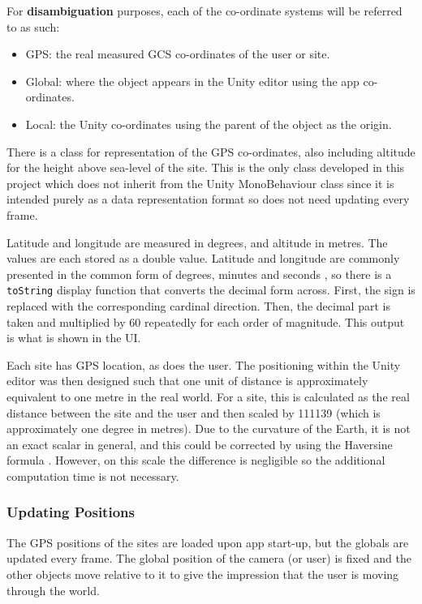 \documentclass[12pt, a4paper]{article}
\begin{document}
\newpage
For \textbf{disambiguation} purposes, each of the co-ordinate systems will be referred to as such:
\begin{itemize}
    \item GPS: the real measured GCS co-ordinates of the user or site.
    \item Global: where the object appears in the Unity editor using the app co-ordinates.
    \item Local: the Unity co-ordinates using the parent of the object as the origin.
\end{itemize}

There is a class for representation of the GPS co-ordinates, also including altitude for the height above sea-level of the site. This is the only class developed in this project which does not inherit from the Unity MonoBehaviour class since it is intended purely as a data representation format so does not need updating every frame. 

Latitude and longitude are measured in degrees, and altitude in metres. The values are each stored as a double value. Latitude and longitude are commonly presented in the common form of degrees, minutes and seconds \cite{movement:latitudelongitude}, so there is a \verb|toString| display function that converts the decimal form across. First, the sign is replaced with the corresponding cardinal direction. Then, the decimal part is taken and multiplied by 60 repeatedly for each order of magnitude. This output is what is shown in the UI.

Each site has GPS location, as does the user. The positioning within the Unity editor was then designed such that one unit of distance is approximately equivalent to one metre in the real world. For a site, this is calculated as the real distance between the site and the user and then scaled by 111139 (which is approximately one degree in metres). Due to the curvature of the Earth, it is not an exact scalar in general, and this could be corrected by using the Haversine formula \cite{movement:haversine}. However, on this scale the difference is negligible so the additional computation time is not necessary.

\subsubsection{Updating Positions}
The GPS positions of the sites are loaded upon app start-up, but the globals are updated every frame. The global position of the camera (or user) is fixed and the other objects move relative to it to give the impression that the user is moving through the world. 
\end{document}
